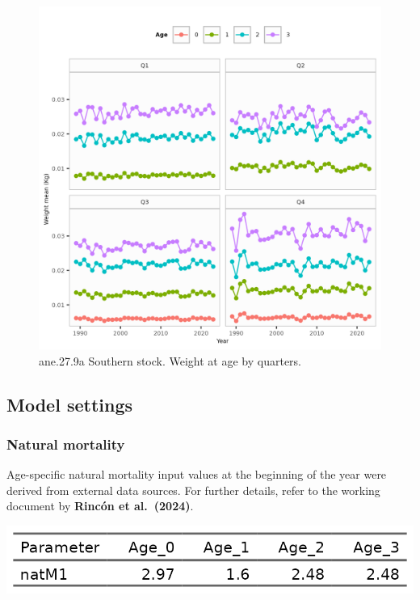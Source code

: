 \documentclass[
]{article}
\begin{document}
\begin{figure}[H]

{\centering \includegraphics[width=0.95\linewidth]{report/run/S1.0_4FLEETS_SelECO_RecIndex_Mnewfix/fig_weight_by_quarters} 

}

\caption{ane.27.9a Southern stock. Weight at age by quarters.}\label{fig:unnamed-chunk-35}
\end{figure}

\hypertarget{model-settings}{%
\subsection{Model settings}\label{model-settings}}

\hypertarget{natural-mortality}{%
\subsubsection{Natural mortality}\label{natural-mortality}}

Age-specific natural mortality input values at the beginning of the year
were derived from external data sources. For further details, refer to
the working document by \textbf{Rincón et al.~(2024)}.

\begin{center}\includegraphics[width=0.95\linewidth]{report/run/S1.0_4FLEETS_SelECO_RecIndex_Mnewfix/tb_natM} \end{center}
\end{document}

